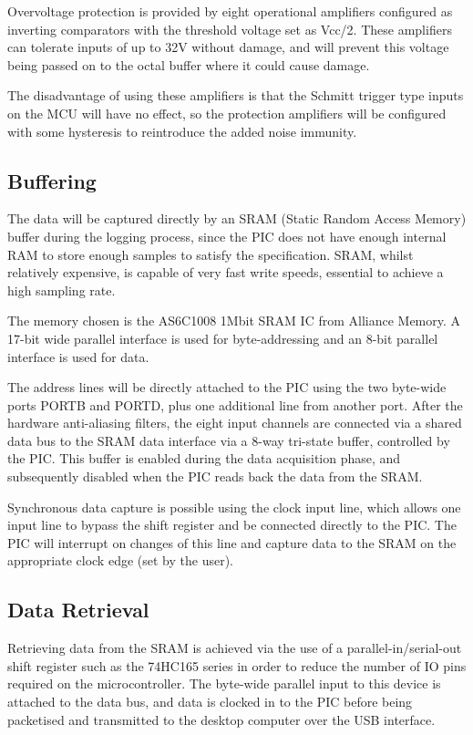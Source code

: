 \documentclass[11pt]{article}
\begin{document}
    Overvoltage protection is provided by eight operational amplifiers
    configured as inverting comparators with the threshold voltage set as
    Vcc/2. These amplifiers can tolerate inputs of up to 32V without damage, and
    will prevent this voltage being passed on to the octal buffer where it could
    cause damage.

    The disadvantage of using these amplifiers is that the Schmitt trigger type inputs on the MCU will have no effect, so the protection amplifiers will be
    configured with some hysteresis to reintroduce the added noise immunity.

\subsection{Buffering}
    The data will be captured directly by an SRAM (Static Random Access Memory) buffer during the logging process, since the PIC does not have enough internal RAM to store enough samples to satisfy the specification. SRAM, whilst relatively expensive, is capable of very fast write speeds, essential to achieve a high sampling rate.

    The memory chosen is the AS6C1008 1Mbit SRAM IC from Alliance Memory. A 17-bit wide parallel interface is used for byte-addressing and an 8-bit parallel interface is used for data.

    The address lines will be directly attached to the PIC using the two byte-wide ports PORTB and PORTD, plus one additional line from another port. After the hardware anti-aliasing filters, the eight input channels are connected via a shared data bus to the SRAM data interface via a 8-way tri-state buffer, controlled by the PIC. This buffer is enabled during the data acquisition phase, and subsequently disabled when the PIC reads back the data from the SRAM.

    Synchronous data capture is possible using the clock input line, which allows one input line to bypass the shift register and be connected directly to the PIC.  The PIC will interrupt on changes of this line and capture data to the SRAM on the appropriate clock edge (set by the user).

\subsection{Data Retrieval}
    Retrieving data from the SRAM is achieved via the use of a parallel-in/serial-out shift register such as the 74HC165 series in order to reduce the number of IO pins required on the microcontroller. The byte-wide parallel input to this device is attached to the data bus, and data is clocked in to the PIC before being packetised and transmitted to the desktop computer over the USB interface.
\end{document}
